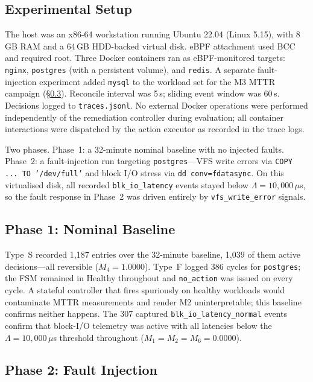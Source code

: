 \documentclass[conference]{IEEEtran}
\begin{document}
\subsection{Experimental Setup}

The host was an x86-64 workstation running Ubuntu 22.04 (Linux 5.15), with 8\,GB RAM and a 64\,GB HDD-backed virtual disk. eBPF attachment used BCC and required root. Three Docker containers ran as eBPF-monitored targets: \texttt{nginx}, \texttt{postgres} (with a persistent volume), and \texttt{redis}. A separate fault-injection experiment added \texttt{mysql} to the workload set for the M3 MTTR campaign (§\ref{sec:m3}). Reconcile interval was 5\,s; sliding event window was 60\,s. Decisions logged to \texttt{traces.jsonl}. No external Docker operations were performed independently of the remediation controller during evaluation; all container interactions were dispatched by the action executor as recorded in the trace logs.

Two phases. Phase~1: a 32-minute nominal baseline with no injected faults. Phase~2: a fault-injection run targeting \texttt{postgres}---VFS write errors via \texttt{COPY ... TO '/dev/full'} and block I/O stress via \texttt{dd conv=fdatasync}. On this virtualised disk, all recorded \texttt{blk\_io\_latency} events stayed below $\Lambda = 10{,}000\,\mu$s, so the fault response in Phase~2 was driven entirely by \texttt{vfs\_write\_error} signals.

\subsection{Phase 1: Nominal Baseline}

Type~S recorded 1,187 entries over the 32-minute baseline, 1,039 of them active decisions---all reversible ($M_4 = 1.0000$). Type~F logged 386 cycles for \texttt{postgres}; the FSM remained in Healthy throughout and \texttt{no\_action} was issued on every cycle. A stateful controller that fires spuriously on healthy workloads would contaminate MTTR measurements and render M2 uninterpretable; this baseline confirms neither happens. The 307 captured \texttt{blk\_io\_latency\_normal} events confirm that block-I/O telemetry was active with all latencies below the $\Lambda = 10{,}000\,\mu$s threshold throughout ($M_1 = M_2 = M_6 = 0.0000$).

\subsection{Phase 2: Fault Injection}
\label{sec:m3}
\end{document}
